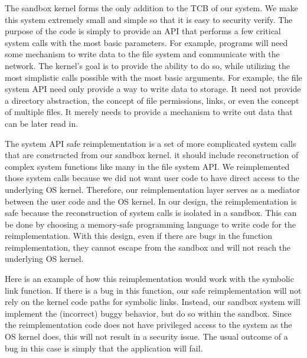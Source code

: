 The sandbox kernel forms the only addition to the TCB of our system.  We 
make this system extremely small and simple so that it is easy to security
verify.  The purpose of the code is simply to provide an API that performs
a few critical system calls with the most basic parameters.  For example,
programs will need some mechanism to write data to the file system
and communicate with the network.  The kernel's goal is to provide the ability
to do so, while utilizing the most simplistic calls possible with the most
basic arguments.  For example, the file system API need only provide a way
to write data to storage.  It need not provide a directory abstraction, the
concept of file permissions, links, or even the concept of multiple files.
It merely needs to provide a mechanism to write out data that can be later
read in.  


The system API safe reimplementation is a set of more complicated system calls 
that are constructed from our sandbox kernel. it should include reconstruction of 
complex system functions like many in the file system API. 
We reimplemented those system calls because we did not want user code 
to have direct access to the underlying OS kernel. 
Therefore, our reimplementation layer serves as a mediator between the user code 
and the OS kernel. In our design, the reimplementation is safe 
because the reconstruction of system calls is isolated in a sandbox. 
This can be done by choosing a memory-safe programming language to write code for the reimplementation. 
With this design, even if there are bugs in the function reimplementation, 
they cannot escape from the sandbox and will not reach the underlying OS kernel. 

Here is an example of how this reimplementation would work with the symbolic link function. 
  
If there is a bug in this function, our safe reimplementation will not rely on the kernel code paths for symbolic links. 
Instead, our sandbox system will implement the (incorrect) buggy behavior, but do so within the sandbox. 
Since the reimplementation code does not have privileged access to the system as the OS kernel does, 
this will not result in a security issue. The usual outcome of a bug in this case is simply that the application will fail.

